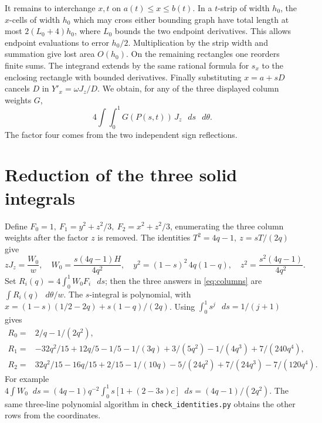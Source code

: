 \documentclass[11pt,letterpaper]{article}
\newcommand{\sect}[1]{\section[#1]{\color{ink}#1}}
\newcommand{\dd}{\mathop{}\!d}
\begin{document}
It remains to interchange \(x,t\) on \(a(t)\le x\le b(t)\). In a \(t\)-strip of width \(h_0\), the \(x\)-cells of width \(h_0\) which may cross either bounding graph have total length at most \(2(L_0+4)h_0\), where \(L_0\) bounds the two endpoint derivatives. This allows endpoint evaluations to error \(h_0/2\). Multiplication by the strip width and summation give lost area \(O(h_0)\). On the remaining rectangles one reorders finite sums. The integrand extends by the same rational formula for \(s_x\) to the enclosing rectangle with bounded derivatives. Finally substituting \(x=a+sD\) cancels \(D\) in \(Y'_x=\omega J_z/D\). We obtain, for any of the three displayed column weights \(G\),
\begin{equation}
 4\int\!\int_0^1 G(P(s,t))\,J_z\,\dd s\,\dd\theta . \label{eq:columns}
\end{equation}
The factor four comes from the two independent sign reflections.

\newpage
\sect{Reduction of the three solid integrals}\label{sec:reduce}
Define \(F_0=1,\ F_1=y^2+z^2/3,\ F_2=x^2+z^2/3\), enumerating the three column weights after the factor \(z\) is removed. The identities \(T^2=4q-1,\ z=sT/(2q)\) give
\[
 zJ_z=\frac{W_0}{w},\quad W_0=\frac{s(4q-1)H}{4q^2},\quad
 y^2=(1-s)^2\,4q(1-q),\quad z^2=\frac{s^2(4q-1)}{4q^2}.
\]
Set \(R_i(q)=4\int_0^1 W_0 F_i\,\dd s\); then the three answers in \eqref{eq:columns} are \(\int R_i(q)\,\dd\theta/w\). The \(s\)-integral is polynomial, with \(x=(1-s)(1/2-2q)+s(1-q)/(2q)\). Using \(\int_0^1s^j\,\dd s=1/(j+1)\) gives
\begin{align*}
 R_0={}& 2/q-1/(2q^2),\\
 R_1={}&-32q^2/15+12q/5-1/5-1/(3q)+3/(5q^2)-1/(4q^3)+7/(240q^4),\\
 R_2={}& 32q^2/15-16q/15+2/15-1/(10q)-5/(24q^2)+7/(24q^3)-7/(120q^4).
\end{align*}
For example \(4\int W_0\dd s=(4q-1)q^{-2}\int_0^1 s[1+(2-3s)c]\dd s=(4q-1)/(2q^2)\). The same three-line polynomial algorithm in \texttt{check\_identities.py} obtains the other rows from the coordinates.
\end{document}
